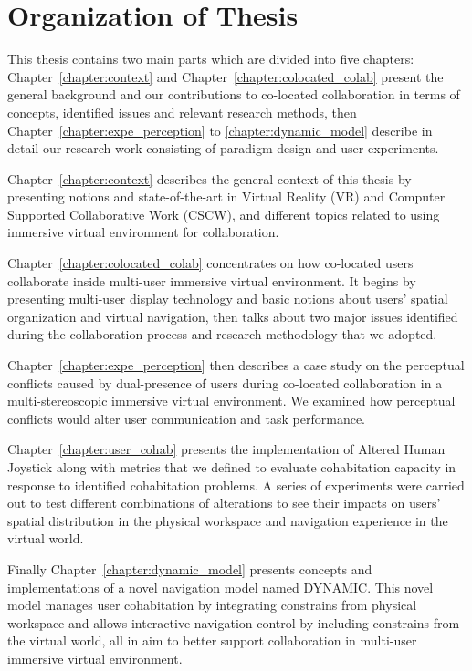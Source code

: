 \section*{Organization of Thesis}
This thesis contains two main parts which are divided into five chapters: Chapter~\ref{chapter:context} and Chapter~\ref{chapter:colocated_colab} present the general background and our contributions to co-located collaboration in terms of concepts, identified issues and relevant research methods, then Chapter~\ref{chapter:expe_perception} to \ref{chapter:dynamic_model} describe in detail our research work consisting of paradigm design and user experiments.

Chapter~\ref{chapter:context} describes the general context of this thesis by presenting notions and state-of-the-art in Virtual Reality (VR) and Computer Supported Collaborative Work (CSCW), and different topics related to using immersive virtual environment for collaboration.

Chapter~\ref{chapter:colocated_colab} concentrates on how co-located users collaborate inside multi-user immersive virtual environment. It begins by presenting multi-user display technology and basic notions about users' spatial organization and virtual navigation, then talks about two major issues identified during the collaboration process and research methodology that we adopted. 

Chapter~\ref{chapter:expe_perception} then describes a case study on the perceptual conflicts caused by dual-presence of users during co-located collaboration in a multi-stereoscopic immersive virtual environment. We examined how perceptual conflicts would alter user communication and task performance.

Chapter~\ref{chapter:user_cohab} presents the implementation of Altered Human Joystick along with metrics that we defined to evaluate cohabitation capacity in response to identified cohabitation problems. A series of experiments were carried out to test different combinations of alterations to see their impacts on users' spatial distribution in the physical workspace and navigation experience in the virtual world.

Finally Chapter~\ref{chapter:dynamic_model} presents concepts and implementations of a novel navigation model named DYNAMIC. This novel model manages user cohabitation by integrating constrains from physical workspace and allows interactive navigation control by including constrains from the virtual world, all in aim to better support collaboration in multi-user immersive virtual environment.